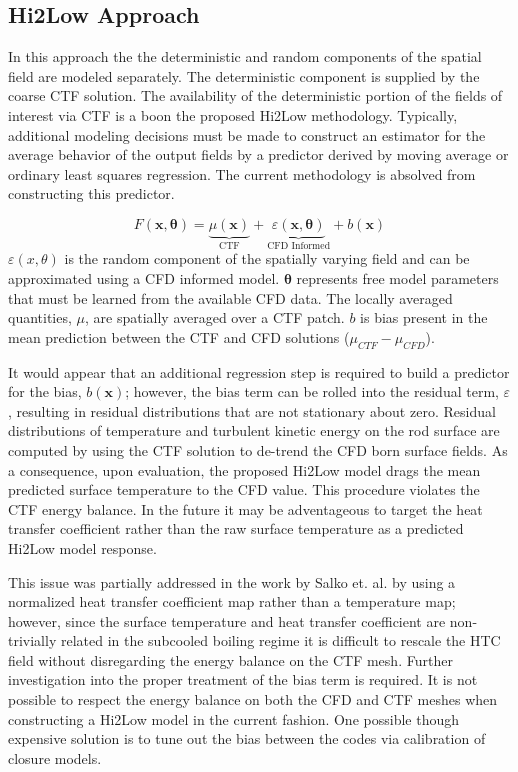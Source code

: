 \subsection{Hi2Low Approach}

In this approach the the deterministic and random components of the spatial field are modeled separately.  The deterministic component is supplied by the coarse CTF solution.
The availability of the deterministic portion of the fields of interest via CTF is a boon the proposed Hi2Low methodology.  Typically, additional modeling decisions must be made to construct an estimator for the average behavior of the output fields by a predictor derived by moving average or ordinary least squares regression.  The current methodology is absolved from constructing this predictor.

\begin{equation}
    F(\mathbf x, \mathbf \theta) = \underbrace{\mu(\mathbf{x})}_\text{CTF} + \underbrace{\varepsilon({\mathbf x, \mathbf \theta})}_\text{CFD Informed} + b(\mathbf{x})
\end{equation}
$\varepsilon(x, \theta)$ is the random component of the spatially varying field and can be approximated using a CFD informed model.  $\mathbf \theta$ represents free model parameters that must be learned from the available CFD data.
 The locally averaged quantities, $\mu$, are spatially averaged over a CTF patch.
$b$ is bias present in the mean prediction between the CTF and CFD solutions ($\mu_{CTF} - \mu_{CFD}$).

It would appear that an additional regression step is required to build a predictor for the bias, $b(\mathbf{x})$; however, the bias term can be rolled into the residual term, $\varepsilon$, resulting in residual distributions that are not stationary about zero.
Residual distributions of temperature and turbulent kinetic energy on the rod surface are computed by using the CTF solution to de-trend the CFD born surface fields.  As a consequence, upon evaluation, the proposed Hi2Low model drags the mean predicted surface temperature to the CFD value.  This procedure violates the CTF energy balance.  In the future it may be adventageous to target the heat transfer coefficient rather than the raw surface temperature as a predicted Hi2Low model response.

This issue was partially addressed in the work by Salko et. al. by using a normalized heat transfer coefficient map rather than a temperature map; however, since the surface temperature and heat transfer coefficient are non-trivially related in the subcooled boiling regime it is difficult to rescale the HTC field without disregarding the energy balance on the CTF mesh.  Further investigation into the proper treatment of the bias term is required.  It is not possible to respect the energy balance on both the CFD and CTF meshes when constructing a Hi2Low model in the current fashion.  One possible though expensive solution is to tune out the bias between the codes via calibration of closure models.

